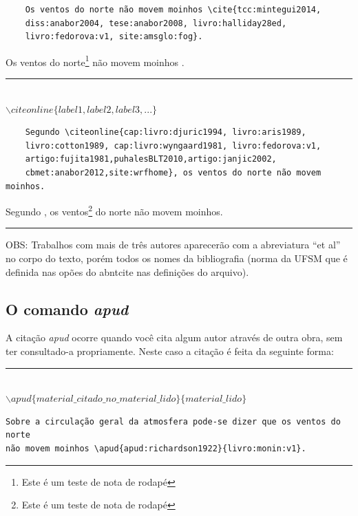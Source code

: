 \documentclass[oneside,openright,12pt]{ufsm_2021} %
\begin{document}
	\begin{verbatim}
	Os ventos do norte não movem moinhos \cite{tcc:mintegui2014, 
	diss:anabor2004, tese:anabor2008, livro:halliday28ed, 
	livro:fedorova:v1, site:amsglo:fog}.
	\end{verbatim}
	    
	\par Os ventos do norte\footnote{Este é um teste de nota de rodapé} não movem moinhos \cite{tcc:mintegui2014,diss:anabor2004,tese:anabor2008,livro:halliday28ed,livro:fedorova:v1,site:amsglo:fog}.
        
        \begin{center}\rule{0.5\textwidth}{1pt}\\$\backslash citeonline\{label1,label2,label3,...\}$\end{center}
        
	\begin{verbatim}
	Segundo \citeonline{cap:livro:djuric1994, livro:aris1989, 
	livro:cotton1989, cap:livro:wyngaard1981, livro:fedorova:v1, 
	artigo:fujita1981,puhalesBLT2010,artigo:janjic2002,
	cbmet:anabor2012,site:wrfhome}, os ventos do norte não movem moinhos.
	\end{verbatim}
            
        \par Segundo , os ventos\footnote{Este é um teste de nota de rodapé} do norte não movem moinhos.
        \begin{center}\rule{0.5\textwidth}{1pt}\end{center}   
         \par OBS: Trabalhos com mais de três autores aparecerão com a abreviatura ``et al'' no corpo do texto, porém todos os nomes da bibliografia (norma da UFSM que é definida nas opões do abntcite nas definições do arquivo). 
  
  \subsection{O comando \textit{apud}}

  \par A citação \textit{apud} ocorre quando você cita algum autor através de outra obra, sem ter consultado-a propriamente. Neste caso a citação é feita da seguinte forma:
  \begin{center}
  \rule{0.5\textwidth}{1pt}\\
  $\backslash apud\{material\_citado\_no\_material\_lido\}\{material\_lido\}$ \\
  \end{center}
\begin{verbatim}
Sobre a circulação geral da atmosfera pode-se dizer que os ventos do norte
não movem moinhos \apud{apud:richardson1922}{livro:monin:v1}.
\end{verbatim}
  
\end{document}

